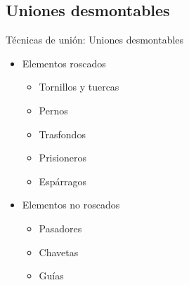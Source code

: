 \documentclass{beamer}
\begin{document}
\subsection{Uniones desmontables}
\begin{frame}{Técnicas de unión: Uniones desmontables}
\begin{itemize}
    \item Elementos roscados
    \begin{itemize}
        \item Tornillos y tuercas
        \item Pernos
        \item Trasfondos
        \item Prisioneros
        \item Espárragos
    \end{itemize}
    \item Elementos no roscados
    \begin{itemize}
        \item Pasadores
        \item Chavetas
        \item Guías
    \end{itemize}
\end{itemize}

\end{frame}
\ThankYouFrame
\end{document}
